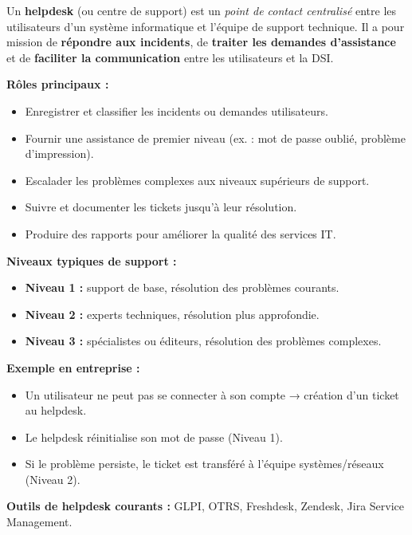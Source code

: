 \documentclass[a4paper,11pt]{article}
\begin{document}
\begin{tcolorbox}[colback=gray!5,colframe=gray!60!black,title=Qu'est-ce qu'un Helpdesk ?]

Un \textbf{helpdesk} (ou centre de support) est un \textit{point de contact centralisé} entre les 
utilisateurs d’un système informatique et l’équipe de support technique.  
Il a pour mission de \textbf{répondre aux incidents}, de \textbf{traiter les demandes d’assistance} 
et de \textbf{faciliter la communication} entre les utilisateurs et la DSI.  

\medskip
\textbf{Rôles principaux :}
\begin{itemize}
  \item Enregistrer et classifier les incidents ou demandes utilisateurs.
  \item Fournir une assistance de premier niveau (ex. : mot de passe oublié, problème d’impression).
  \item Escalader les problèmes complexes aux niveaux supérieurs de support.
  \item Suivre et documenter les tickets jusqu’à leur résolution.
  \item Produire des rapports pour améliorer la qualité des services IT.
\end{itemize}

\medskip
\textbf{Niveaux typiques de support :}
\begin{itemize}
  \item \textbf{Niveau 1 :} support de base, résolution des problèmes courants.
  \item \textbf{Niveau 2 :} experts techniques, résolution plus approfondie.
  \item \textbf{Niveau 3 :} spécialistes ou éditeurs, résolution des problèmes complexes.
\end{itemize}

\medskip
\textbf{Exemple en entreprise :}
\begin{itemize}
  \item Un utilisateur ne peut pas se connecter à son compte → création d’un ticket au helpdesk.
  \item Le helpdesk réinitialise son mot de passe (Niveau 1).
  \item Si le problème persiste, le ticket est transféré à l’équipe systèmes/réseaux (Niveau 2).
\end{itemize}

\medskip
\textbf{Outils de helpdesk courants :} GLPI, OTRS, Freshdesk, Zendesk, Jira Service Management.
\end{tcolorbox}
\end{document}

